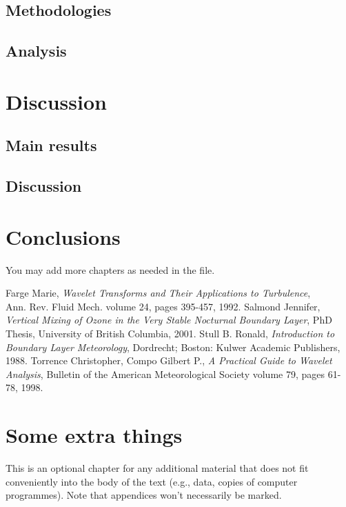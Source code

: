 \documentclass[11pt]{book}
\begin{document}
\section{Methodologies}
\section{Analysis}
\chapter{Discussion }
\section{Main results}
\section{Discussion}
\chapter{Conclusions}
You may add more chapters as needed in the file.



		
			

\renewcommand{\bibname}{References} %
\begin{thebibliography}{99} 


 Farge Marie, {\em Wavelet Transforms and Their Applications to Turbulence},  \\Ann. Rev. Fluid Mech. volume 24, pages 395-457, 1992.
  Salmond Jennifer,  {\em Vertical Mixing of Ozone in the Very Stable Nocturnal Boundary Layer}, PhD Thesis, University of British Columbia, 2001.
 Stull B. Ronald, {\em Introduction to Boundary Layer Meteorology}, Dordrecht; Boston: Kulwer Academic Publishers, 1988. %
 Torrence Christopher, Compo Gilbert P., {\em A Practical Guide to Wavelet Analysis}, Bulletin of the American Meteorological Society volume 79, pages 61-78, 1998. 
\end{thebibliography}


\appendix%
\chapter{Some extra things} 

This is an optional chapter for any additional material that does not fit 
conveniently into the body of the text (e.g., data, copies of computer programmes). 
Note that appendices won't necessarily be marked.
\end{document}
